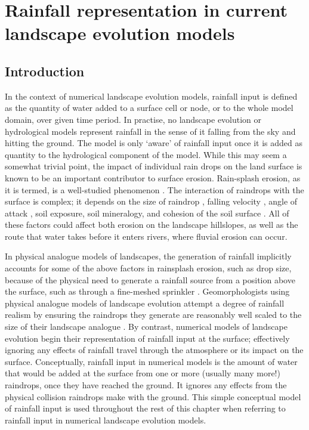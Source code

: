 \chapter{Rainfall representation in current landscape evolution models}
\label{chapter_RainfallInLEMs}

\section{Introduction}
In the context of numerical landscape evolution models, rainfall input is defined as the quantity of water added to a surface cell or node, or to the whole model domain, over given time period. In practise, no landscape evolution or hydrological models represent rainfall in the sense of it falling from the sky and hitting the ground. The model is only `aware' of rainfall input once it is added as quantity to the hydrological component of the model.  While this may seem a somewhat trivial point, the impact of individual rain drops on the land surface is known to be an important contributor to surface erosion. Rain-splash erosion, as it is termed, is a well-studied phenomenon \citep{morgan1978field, meyer1981rain}. The interaction of raindrops with the surface is complex; it depends on the size of raindrop \citep{morgan1998european}, falling velocity \citep{park1983rainfall}, angle of attack \citep{pedersen1995influence}, soil exposure, soil mineralogy, and cohesion of the soil surface \citep{luk1979effect}. All of these factors could affect both erosion on the landscape hillslopes, as well as the route that water takes before it enters rivers, where fluvial erosion can occur. 

In physical analogue models of landscapes, the generation of rainfall implicitly accounts for some of the above factors in rainsplash erosion, such as drop size, because of the physical need to generate a rainfall source from a position above the surface, such as through a fine-meshed sprinkler \citep[e.g.][]{hancock2001use}. Geomorphologists using physical analogue models of landscape evolution attempt a degree of rainfall realism by ensuring the raindrops they generate are reasonably well scaled to the size of their landscape analogue \citep{meyer1994rainfall}. By contrast, numerical models of landscape evolution begin their representation of rainfall input at the surface; effectively ignoring any effects of rainfall travel through the atmosphere or its impact on the surface. Conceptually, rainfall input in numerical models is the amount of water that would be added at the surface from one or more (usually many more!) raindrops, once they have reached the ground. It ignores any effects from the physical collision raindrops make with the ground. This simple conceptual model of rainfall input is used throughout the rest of this chapter when referring to rainfall input in numerical landscape evolution models.

